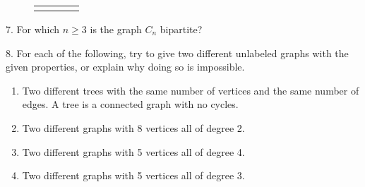 \documentclass[10pt,]{book}
\theoremstyle{plain}
\theoremstyle{definition}
\numberwithin{equation}{chapter}
\newlength{\panelmax}
\begin{document}
\begin{exerciselist}
{%
\begin{figure}
\hspace*{0.025\textwidth}%
\begin{tabular}{@{}*{4}{c}@{}}
\begin{minipage}[c][\panelmax][c]{0.2\textwidth}\usebox{\panelboxWimage}\end{minipage}&
\begin{minipage}[c][\panelmax][c]{0.2\textwidth}\usebox{\panelboxXimage}\end{minipage}&
\begin{minipage}[c][\panelmax][c]{0.2\textwidth}\usebox{\panelboxYimage}\end{minipage}&
\begin{minipage}[c][\panelmax][c]{0.2\textwidth}\usebox{\panelboxZimage}\end{minipage}\end{tabular}
\end{figure}
}%
\par\smallskip
\item[7.]\hypertarget{exercise-280}{}
			For which \(n \ge 3\) is the graph \(C_n\) bipartite?
\par\smallskip
\item[8.]\hypertarget{exercise-281}{}
			For each of the following, try to give two different unlabeled graphs with the given properties, or explain why doing so is impossible.
		\leavevmode%
\begin{enumerate}[label=(\alph*)]
\item\hypertarget{li-770}{}
					Two different trees with the same number of vertices and the same number of edges. A tree is a connected graph with no cycles.
\item\hypertarget{li-771}{}
					Two different graphs with 8 vertices all of degree 2.
\item\hypertarget{li-772}{}
					Two different graphs with 5 vertices all of degree 4.
\item\hypertarget{li-773}{}
					Two different graphs with 5 vertices all of degree 3.
\end{enumerate}

\par\smallskip
\end{exerciselist}
\typeout{************************************************}
\typeout{************************************************}
\end{document}
